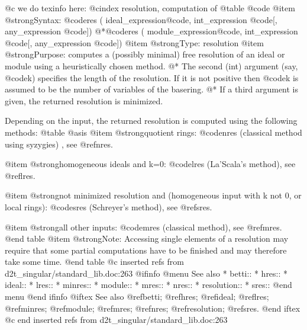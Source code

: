 {{{{{{@c we do texinfo here:
@cindex resolution, computation of
@table @code
@item @strong{Syntax:}
@code{res (} ideal_expression@code{,} int_expression @code{[,} any_expression @code{])}
@*@code{res (} module_expression@code{,} int_expression @code{[,} any_expression @code{])}
@item @strong{Type:}
resolution
@item @strong{Purpose:}
computes a (possibly minimal) free resolution of an ideal or module using
a heuristically chosen method.
@* The second (int) argument (say, @code{k}) specifies the length of
the resolution. If it is not positive then @code{k} is assumed to be the
number of variables of the basering.
@* If a third argument is given, the returned resolution is minimized.

Depending on the input, the returned resolution is computed using the
following methods:
@table @asis
@item @strong{quotient rings:}
@code{nres} (classical method using syzygies) , see @ref{nres}.

@item @strong{homogeneous ideals and k=0:}
@code{lres} (La'Scala's method), see @ref{lres}.

@item @strong{not minimized resolution and (homogeneous input with k not 0, or local rings):}
@code{sres} (Schreyer's method), see @ref{sres}.

@item @strong{all other inputs:}
@code{mres} (classical method), see @ref{mres}.
@end table
@item @strong{Note:}
Accessing single elements of a resolution may require that some partial
computations have to be finished and may therefore take some time.
@end table
@c inserted refs from d2t_singular/standard_lib.doc:263
@ifinfo
@menu
See also
* betti::
* hres::
* ideal::
* lres::
* minres::
* module::
* mres::
* nres::
* resolution::
* sres::
@end menu
@end ifinfo
@iftex
See also
@ref{betti};
@ref{hres};
@ref{ideal};
@ref{lres};
@ref{minres};
@ref{module};
@ref{mres};
@ref{nres};
@ref{resolution};
@ref{sres}.
@end iftex
@c end inserted refs from d2t_singular/standard_lib.doc:263

}}}}}}
